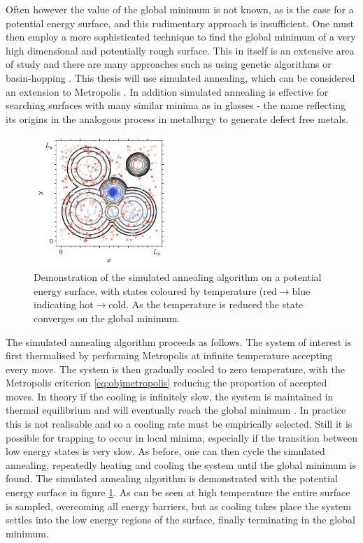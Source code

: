 Often however the value of the global minimum is not known, as is the case for a potential energy surface, and this rudimentary approach is insufficient.
One must then employ a more sophisticated technique to find the global minimum of a very high dimensional and potentially rough surface.
This in itself is an extensive area of study and there are many approaches such as using genetic algorithms or basin\--hopping \cite{Hartke1993,Niesse1996,Wales1997}.
This thesis will use simulated annealing, which can be considered an extension to Metropolis \mc{} \cite{Kirkpatrick1983}.
In addition simulated annealing is effective for searching surfaces with many similar minima as in glasses \-- the name reflecting its origins in the analogous process in metallurgy to generate defect free metals.

\begin{figure}[tb]
     \centering
    \includegraphics[width=0.45\textwidth]{./figures/methods/mc_2d_sa.pdf}
      \caption{Demonstration of the simulated annealing algorithm on a \td{} potential energy surface, with states coloured by temperature (red$\rightarrow$blue indicating hot$\rightarrow$cold. As the temperature is reduced the state converges on the global minimum.}
      \label{fig:montecarloint5}
\end{figure}

The simulated annealing algorithm proceeds as follows.
The system of interest is first thermalised by performing Metropolis \mc{} at infinite temperature \ie{} accepting every move. 
The system is then gradually cooled to zero temperature, with the Metropolis criterion \eqref{eq:objmetropolis} reducing the proportion of accepted moves.
In theory if the cooling is infinitely slow, the system is maintained in thermal equilibrium and will eventually reach the global minimum \cite{Henderson2003}.
In practice this is not realisable and so a cooling rate must be empirically selected.
Still it is possible for trapping to occur in local minima, especially if the transition between low energy states is very slow.
As before, one can then cycle the simulated annealing, repeatedly heating and cooling the system until the global minimum is found.
The simulated annealing algorithm is demonstrated with the \td{} potential energy surface in figure \ref{fig:montecarloint5}.
As can be seen at high temperature the entire surface is sampled, overcoming all energy barriers, but as cooling takes place the system settles into the low energy regions of the surface, finally terminating in the global minimum.


